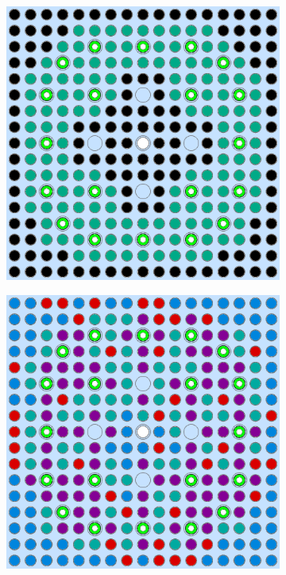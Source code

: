 \begin{appendices}
\begin{figure}[h!]
\begin{subfigure}{0.48\textwidth}
  \includegraphics[width=0.85\linewidth]{figures/unsupervised/geometries/without-features/2-clusters/combined/assm-31-20BPs}
  \caption{}
  \label{fig:no-features-assm-31-20BPs-combined-2}
\end{subfigure}
\begin{subfigure}{0.48\textwidth}
  \centering
  \includegraphics[width=0.85\linewidth]{figures/unsupervised/geometries/without-features/4-clusters/pinch/assm-31-20BPs}
  \caption{}
  \label{fig:no-features-assm-31-20BPs-pinch-4}

\end{subfigure}
\end{figure}
\end{appendices}
